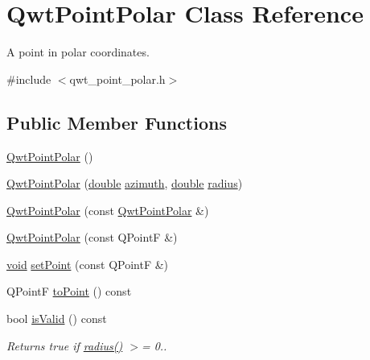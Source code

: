 \hypertarget{class_qwt_point_polar}{\section{Qwt\-Point\-Polar Class Reference}
\label{class_qwt_point_polar}
}


A point in polar coordinates.  




{\ttfamily \#include $<$qwt\-\_\-point\-\_\-polar.\-h$>$}

\subsection*{Public Member Functions}
\begin{DoxyCompactItemize}
\item 
\hyperlink{class_qwt_point_polar_a365875acf86a9f052e12784b5f2f7d44}{Qwt\-Point\-Polar} ()
\item 
\hyperlink{class_qwt_point_polar_af1c77f9730d441937e52ff5beee04975}{Qwt\-Point\-Polar} (\hyperlink{_super_l_u_support_8h_a8956b2b9f49bf918deed98379d159ca7}{double} \hyperlink{class_qwt_point_polar_afac65de2dca25b0b6a6c5fb917fff424}{azimuth}, \hyperlink{_super_l_u_support_8h_a8956b2b9f49bf918deed98379d159ca7}{double} \hyperlink{class_qwt_point_polar_ab629fcfb36f0f29df45b256c6bddf194}{radius})
\item 
\hyperlink{class_qwt_point_polar_ae5cd7e8ab0505672748f779c9668fe29}{Qwt\-Point\-Polar} (const \hyperlink{class_qwt_point_polar}{Qwt\-Point\-Polar} \&)
\item 
\hyperlink{class_qwt_point_polar_a269241ca9f94f641063fe896cdd77165}{Qwt\-Point\-Polar} (const Q\-Point\-F \&)
\item 
\hyperlink{group___u_a_v_objects_plugin_ga444cf2ff3f0ecbe028adce838d373f5c}{void} \hyperlink{class_qwt_point_polar_a8cd4f93356a8a8c07400c3ad9ff1b560}{set\-Point} (const Q\-Point\-F \&)
\item 
Q\-Point\-F \hyperlink{class_qwt_point_polar_ab61dd4130840876c00d79c28ea534d06}{to\-Point} () const 
\item 
bool \hyperlink{class_qwt_point_polar_ad1f8c93359d28322b6e3eeb9758a66f2}{is\-Valid} () const 
\begin{DoxyCompactList}\small\item\em Returns true if \hyperlink{class_qwt_point_polar_ab629fcfb36f0f29df45b256c6bddf194}{radius()} $>$= 0.. \end{DoxyCompactList}\item 

\end{DoxyCompactItemize}
